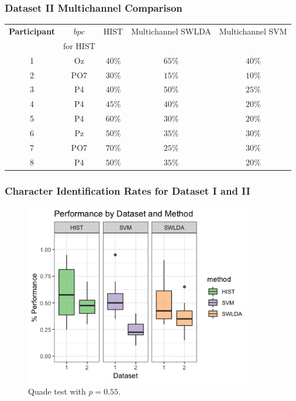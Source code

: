 \documentclass[aspectratio=169]{beamer}
\begin{document}
\begin{frame}
\frametitle{Dataset II Multichannel Comparison}
\begin{center}
\begin{table}[h!]
\centering
\begin{tabular}{c|cc|c|c}
\toprule
\textbf{Participant}	&  $bpc$ 	&  HIST & Multichannel SWLDA & Multichannel SVM  \\
                                    &  for HIST        &           &                                       &   \\
\midrule
1     &     Oz   &     $40\%$  &     $65\%$  &     $40\%$ \\
2     &     PO7   &     $30\%$ &   $15\%$  &     $10\%$ \\
3     &     P4   &     $40\%$ &     $50\%$  &     $25\%$ \\
4     &     P4   &     $45\%$ &     $40\%$  &     $20\%$ \\
5     &     P4   &      $60\%$ &    $30\%$  &     $20\%$ \\
6     &     Pz   &      $50\%$ &    $35\%$  &     $30\%$ \\
7     &     PO7   &      $70\%$ &  $25\%$  &     $30\%$ \\
8     &     P4   &      $50\%$ &    $35\%$  &     $20\%$ \\
\end{tabular}
\label{tab:resultsownswlda}
\end{table}
\end{center}
\end{frame} 

\begin{frame}
\frametitle{Character Identification Rates for Dataset I and II}
\begin{center}
\begin{figure}[h!]
\centering
\includegraphics[width=10cm]{images/boxplots.png}
\caption{Quade test with $p=0.55$.}
\label{fig:boxplots}
\end{figure}
\end{center}
\end{frame} 
\end{document}
